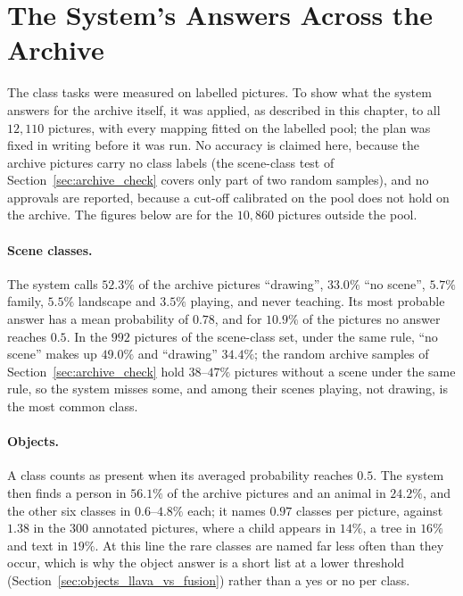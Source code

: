 \section{The System's Answers Across the Archive}
\label{sec:archive_answers}

The class tasks were measured on labelled pictures. To show what the system answers for the archive itself, it was applied, as described in this chapter, to all $12{,}110$ pictures, with every mapping fitted on the labelled pool; the plan was fixed in writing before it was run. No accuracy is claimed here, because the archive pictures carry no class labels (the scene-class test of Section~\ref{sec:archive_check} covers only part of two random samples), and no approvals are reported, because a cut-off calibrated on the pool does not hold on the archive. The figures below are for the $10{,}860$ pictures outside the pool.

\paragraph{Scene classes.} The system calls $52.3\%$ of the archive pictures ``drawing'', $33.0\%$ ``no scene'', $5.7\%$ family, $5.5\%$ landscape and $3.5\%$ playing, and never teaching. Its most probable answer has a mean probability of $0.78$, and for $10.9\%$ of the pictures no answer reaches $0.5$. In the $992$ pictures of the scene-class set, under the same rule, ``no scene'' makes up $49.0\%$ and ``drawing'' $34.4\%$; the random archive samples of Section~\ref{sec:archive_check} hold $38$--$47\%$ pictures without a scene under the same rule, so the system misses some, and among their scenes playing, not drawing, is the most common class.

\paragraph{Objects.} A class counts as present when its averaged probability reaches $0.5$. The system then finds a person in $56.1\%$ of the archive pictures and an animal in $24.2\%$, and the other six classes in $0.6$--$4.8\%$ each; it names $0.97$ classes per picture, against $1.38$ in the $300$ annotated pictures, where a child appears in $14\%$, a tree in $16\%$ and text in $19\%$. At this line the rare classes are named far less often than they occur, which is why the object answer is a short list at a lower threshold (Section~\ref{sec:objects_llava_vs_fusion}) rather than a yes or no per class.

